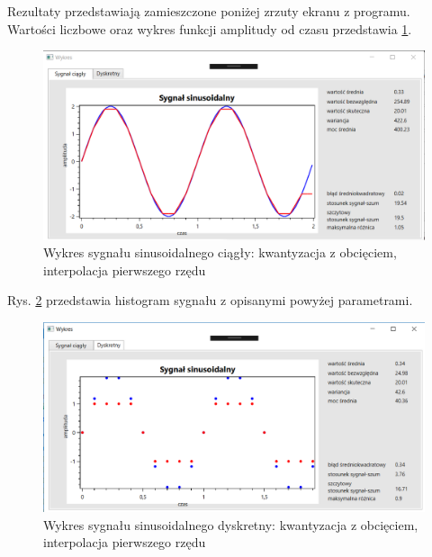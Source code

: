 \documentclass[12pt]{article}
\begin{document}
Rezultaty przedstawiają zamieszczone poniżej zrzuty ekranu z programu. Wartości liczbowe oraz wykres funkcji amplitudy od czasu przedstawia \ref{Wykres dla wynikw eksperymentu pierwszego}.
\begin{figure}[h!]
 \centering
 \includegraphics[width=12.3cm]{SinKwantObcIntA2T2f10H2t1C.PNG}
 \vspace{-0.3cm}
 \caption{Wykres sygnału sinusoidalnego ciągły: kwantyzacja z obcięciem, interpolacja pierwszego rzędu}
 \label{Wykres dla wynikw eksperymentu pierwszego}
\end{figure}

\newpage
Rys. \ref{Wykres dla wynikw eksperymentu pierwszego h} przedstawia histogram sygnału z opisanymi powyżej parametrami. 

\begin{figure}[h!]
 \centering
 \includegraphics[width=12.3cm]{SinKwantObcIntA2T2f10H2t1D.PNG}
 \vspace{-0.3cm}
 \caption{Wykres sygnału sinusoidalnego dyskretny: kwantyzacja z obcięciem, interpolacja pierwszego rzędu}
 \label{Wykres dla wynikw eksperymentu pierwszego h}
\end{figure}

\end{document}
